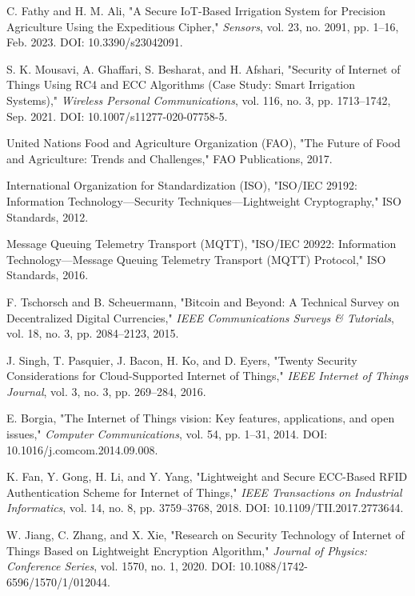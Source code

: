 \documentclass[conference]{IEEEtran}
\begin{document}
\begin{thebibliography}{99}
     C. Fathy and H. M. Ali, "A Secure IoT-Based Irrigation System for Precision Agriculture Using the Expeditious Cipher," \textit{Sensors}, vol. 23, no. 2091, pp. 1–16, Feb. 2023. DOI: 10.3390/s23042091.

     S. K. Mousavi, A. Ghaffari, S. Besharat, and H. Afshari, "Security of Internet of Things Using RC4 and ECC Algorithms (Case Study: Smart Irrigation Systems)," \textit{Wireless Personal Communications}, vol. 116, no. 3, pp. 1713–1742, Sep. 2021. DOI: 10.1007/s11277-020-07758-5.

     United Nations Food and Agriculture Organization (FAO), "The Future of Food and Agriculture: Trends and Challenges," FAO Publications, 2017.

     International Organization for Standardization (ISO), "ISO/IEC 29192: Information Technology—Security Techniques—Lightweight Cryptography," ISO Standards, 2012.

     Message Queuing Telemetry Transport (MQTT), "ISO/IEC 20922: Information Technology—Message Queuing Telemetry Transport (MQTT) Protocol," ISO Standards, 2016.

     F. Tschorsch and B. Scheuermann, "Bitcoin and Beyond: A Technical Survey on Decentralized Digital Currencies," \textit{IEEE Communications Surveys \& Tutorials}, vol. 18, no. 3, pp. 2084–2123, 2015.

     J. Singh, T. Pasquier, J. Bacon, H. Ko, and D. Eyers, "Twenty Security Considerations for Cloud-Supported Internet of Things," \textit{IEEE Internet of Things Journal}, vol. 3, no. 3, pp. 269–284, 2016.

     E. Borgia, "The Internet of Things vision: Key features, applications, and open issues," \textit{Computer Communications}, vol. 54, pp. 1–31, 2014. DOI: 10.1016/j.comcom.2014.09.008.

     K. Fan, Y. Gong, H. Li, and Y. Yang, "Lightweight and Secure ECC-Based RFID Authentication Scheme for Internet of Things," \textit{IEEE Transactions on Industrial Informatics}, vol. 14, no. 8, pp. 3759–3768, 2018. DOI: 10.1109/TII.2017.2773644.

     W. Jiang, C. Zhang, and X. Xie, "Research on Security Technology of Internet of Things Based on Lightweight Encryption Algorithm," \textit{Journal of Physics: Conference Series}, vol. 1570, no. 1, 2020. DOI: 10.1088/1742-6596/1570/1/012044.


\end{thebibliography}
\end{document}
